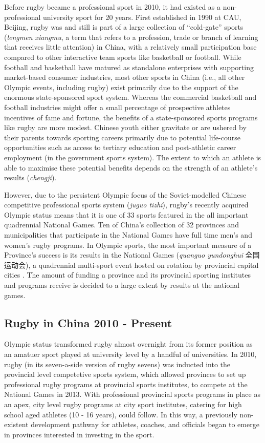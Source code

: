 {Before rugby became a professional sport in 2010, it had existed as a non-professional university sport for 20 years.  First established in 1990 at CAU, Beijing, rugby was and still is part of a large collection of ``cold-gate'' sports (\textit{lengmen xiangmu}, a term that refers to a profession, trade or branch of learning that receives little attention) in China, with a relatively small participation base compared to other interactive team sports like basketball or football.  While football and basketball have matured as standalone enterprises with supporting market-based consumer industries, most other sports in China (i.e., all other Olympic events, including rugby) exist primarily due to the support of the enormous state-sponsored sport system.  Whereas the commercial basketball and football industries might offer a small percentage of prospective athletes incentives of fame and fortune, the benefits of a state-sponsored sports programs like rugby are more modest.  Chinese youth either gravitate or are ushered by their parents towards sporting careers primarily due to potential life-course opportunities such as access to tertiary education and post-athletic career employment (in the government sports system).  The extent to which an athlete is able to maximise these potential benefits depends on the strength of an athlete's results (\textit{chengji}).

However, due to the persistent Olympic focus of the Soviet-modelled Chinese competitive professional sports system (\textit{juguo tizhi}), rugby's recently acquired Olympic status means that it is one of 33 sports featured in the all important quadrennial National Games.  Ten of China's collection of 32 provinces and municipalities that participate in the National Games have full time men's and women's rugby programs.  In Olympic sports, the most important measure of a Province's success is its results in the National Games (\textit{quanguo yundonghui} 全国运动会), a quadrennial multi-sport event hosted on rotation by provincial capital cities \citep{Hong2002}.  The amount of funding a province and its provincial sporting institutes and programs receive is decided to a large extent by results at the national games.


\subsection{Rugby in China 2010 - Present}
Olympic status transformed rugby almost overnight from its former position as an amatuer sport played at university level by a handful of universities.  In 2010, rugby (in its seven-a-side version of rugby sevens) was inducted into the provincial level competetive sports system, which allowed provinces to set up professional rugby programs at provincial sports institutes, to compete at the National Games in 2013.  With professional provincial sports programs in place as an apex, city level rugby programs at city sport institutes, catering for high school aged athletes (10 - 16 years), could follow.  In this way, a previously non-existent development pathway for athletes, coaches, and officials began to emerge in provinces interested in investing in the sport.

}
